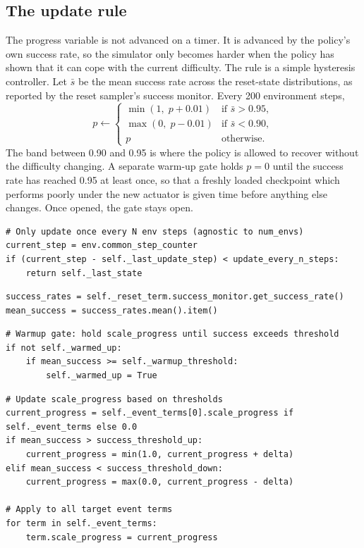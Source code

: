 \subsection{The update rule}

The progress variable is not advanced on a timer. It is advanced by the policy's own success rate, so the simulator only becomes harder when the policy has shown that it can cope with the current difficulty. The rule is a simple hysteresis controller. Let $\bar s$ be the mean success rate across the reset-state distributions, as reported by the reset sampler's success monitor. Every 200 environment steps,
\begin{equation}
  p \leftarrow
  \begin{cases}
    \min(1,\;p+0.01) & \text{if } \bar s > 0.95,\\
    \max(0,\;p-0.01) & \text{if } \bar s < 0.90,\\
    p & \text{otherwise.}
  \end{cases}
  \label{eq:rule}
\end{equation}
The band between 0.90 and 0.95 is where the policy is allowed to recover without the difficulty changing. A separate warm-up gate holds $p=0$ until the success rate has reached 0.95 at least once, so that a freshly loaded checkpoint which performs poorly under the new actuator is given time before anything else changes. Once opened, the gate stays open.

\begin{snippetbox}[11]
\begin{lstlisting}[firstnumber=1977]
# Only update once every N env steps (agnostic to num_envs)
current_step = env.common_step_counter
if (current_step - self._last_update_step) < update_every_n_steps:
    return self._last_state
\end{lstlisting}
\snippetelide
\begin{lstlisting}[firstnumber=1988]
success_rates = self._reset_term.success_monitor.get_success_rate()
mean_success = success_rates.mean().item()
\end{lstlisting}
\snippetelide
\begin{lstlisting}[firstnumber=1991]
# Warmup gate: hold scale_progress until success exceeds threshold
if not self._warmed_up:
    if mean_success >= self._warmup_threshold:
        self._warmed_up = True
\end{lstlisting}
\snippetelide
\begin{lstlisting}[firstnumber=2002]
# Update scale_progress based on thresholds
current_progress = self._event_terms[0].scale_progress if self._event_terms else 0.0
if mean_success > success_threshold_up:
    current_progress = min(1.0, current_progress + delta)
elif mean_success < success_threshold_down:
    current_progress = max(0.0, current_progress - delta)

# Apply to all target event terms
for term in self._event_terms:
    term.scale_progress = current_progress
\end{lstlisting}
\end{snippetbox}

